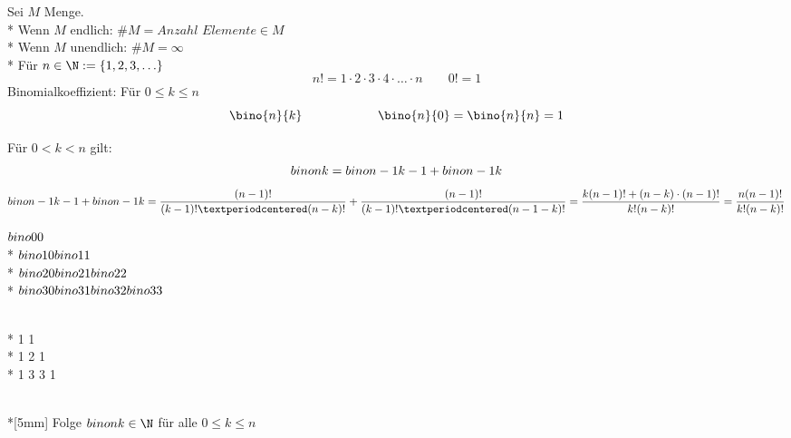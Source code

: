 %
\wdh
Sei $M$ Menge.\\*
Wenn $M$ endlich: $\#M=Anzahl$ $Elemente\in M$\\*
Wenn $M$ unendlich: $\#M=\infty$\\*
Für $n\in \N:=\{1,2,3,\ldots\}$
$$n!=1 · 2 · 3 · 4 · … · n \qquad 0!=1$$
Binomialkoeffizient: Für $0\leq k\leq n$
$$\bino{n}{k} \qquad\qquad\qquad \bino{n}{0}=\bino{n}{n}=1$$

Für $0<k< n$ gilt:
$$\\bino{n}{k} = \\bino{n -1}{k-1} + \\bino{n-1}{k}$$
%
\bew 
$$\\bino{n-1}{k-1}+ \\bino{n-1}{k}=\frac{(n-1)!}{(k-1)!·(n-k)!} +\frac{(n-1)!}{(k-1)!·(n-1-k)!} = \frac{k(n-1)!+(n-k)\cdot(n-1)!}{k! (n-k)!}=\frac{n(n-1)!}{k!(n-k)!}$$

\parbox{0.4\textwidth}{\centering
$\\bino{0}{0}$\\*
$\\bino{1}{0} \\bino{1}{1}$\\*
$\\bino{2}{0} \\bino{2}{1} \\bino{2}{2}$\\*
$\\bino{3}{0} \\bino{3}{1} \\bino{3}{2} \\bino{3}{3}$}\hfill
\parbox{0.4\textwidth}{\\*
1 1\\*
1 2 1\\*
1 3 3 1}\\*[5mm]
Folge $\\bino{n}{k}\in \N$ für alle $0\leq k\leq n$

